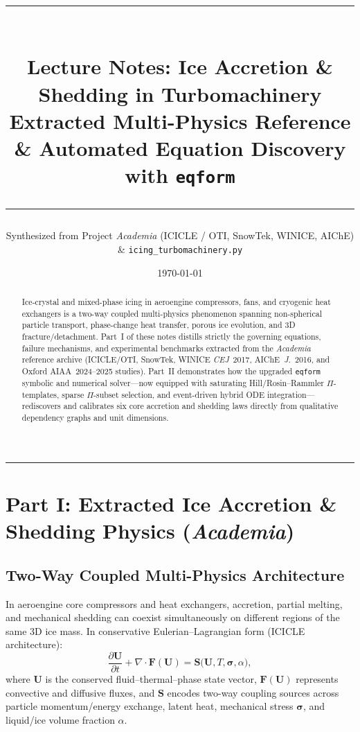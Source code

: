 \documentclass[11pt,a4paper]{article}
\title{
  {\color{navy}\rule{\textwidth}{1.8pt}}\\[0.6em]
  {\LARGE\bfseries\color{navy} Lecture Notes: Ice Accretion \& Shedding in Turbomachinery}\\[0.3em]
  {\large\color{slate} Extracted Multi-Physics Reference \& Automated Equation Discovery with \texttt{eqform}}\\[0.4em]
  {\color{navy}\rule{\textwidth}{0.8pt}}
}
\author{Synthesized from Project \emph{Academia} (ICICLE / OTI, SnowTek, WINICE, AIChE) \& \texttt{icing\_turbomachinery.py}}
\date{\today}
\newcommand{\pd}[2]{\frac{\partial #1}{\partial #2}}
\begin{document}
\maketitle

\begin{abstract}
\noindent Ice-crystal and mixed-phase icing in aeroengine compressors, fans, and cryogenic heat exchangers is a two-way coupled multi-physics phenomenon spanning non-spherical particle transport, phase-change heat transfer, porous ice evolution, and 3D fracture/detachment. Part~I of these notes distills strictly the governing equations, failure mechanisms, and experimental benchmarks extracted from the \emph{Academia} reference archive (ICICLE/OTI, SnowTek, WINICE \emph{CEJ}~2017, AIChE~\emph{J.}~2016, and Oxford AIAA~2024--2025 studies). Part~II demonstrates how the upgraded \texttt{eqform} symbolic and numerical solver—now equipped with saturating Hill/Rosin--Rammler $\Pi$-templates, sparse $\Pi$-subset selection, and event-driven hybrid ODE integration—rediscovers and calibrates six core accretion and shedding laws directly from qualitative dependency graphs and unit dimensions.
\end{abstract}

\tableofcontents
\vspace{0.8em}
\hrule
\vspace{1em}

\section{Part I: Extracted Ice Accretion \& Shedding Physics (\emph{Academia})}

\subsection{Two-Way Coupled Multi-Physics Architecture}
In aeroengine core compressors and heat exchangers, accretion, partial melting, and mechanical shedding can coexist simultaneously on different regions of the same 3D ice mass. In conservative Eulerian--Lagrangian form (ICICLE architecture):
\begin{equation}
  \pd{\mathbf{U}}{t} + \nabla \cdot \mathbf{F}(\mathbf{U}) = \mathbf{S}\bigl(\mathbf{U}, T, \boldsymbol{\sigma}, \alpha\bigr),
\end{equation}
where $\mathbf{U}$ is the conserved fluid--thermal--phase state vector, $\mathbf{F}(\mathbf{U})$ represents convective and diffusive fluxes, and $\mathbf{S}$ encodes two-way coupling sources across particle momentum/energy exchange, latent heat, mechanical stress $\boldsymbol{\sigma}$, and liquid/ice volume fraction $\alpha$.
\end{document}
